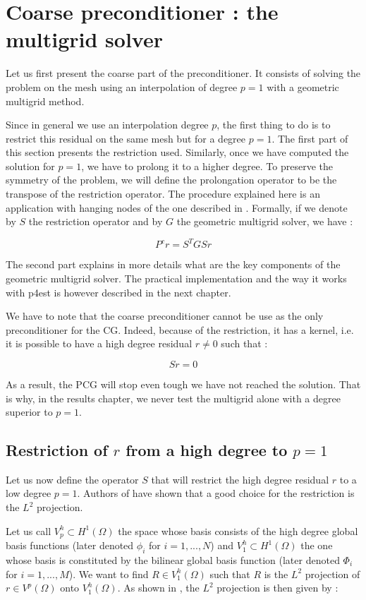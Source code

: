 \section{Coarse preconditioner : the multigrid solver}

Let us first present the coarse part of the preconditioner. It consists of solving the problem on the mesh using an interpolation of degree $p=1$ with a geometric multigrid method. 

Since in general we use an interpolation degree $p$, the first thing to do is to restrict this residual on the same mesh but for a degree $p=1$. The first part of this section presents the restriction used. Similarly, once we have computed the solution for $p=1$, we have to prolong it to a higher degree. To preserve the symmetry of the problem, we will define the prolongation operator to be the transpose of the restriction operator. The procedure explained here is an application with hanging nodes of the one described in \cite{remacle}. Formally, if we denote by $S$ the restriction operator and by $G$ the geometric multigrid solver, we have : 

$$P^cr = S^TGSr$$

The second part explains in more details what are the key components of the geometric multigrid solver. The practical implementation and the way it works with p4est is however described in the next chapter. 

We have to note that the coarse preconditioner cannot be use as the only preconditioner for the CG. Indeed, because of the restriction, it has a kernel, i.e. it is possible to have a high degree residual $r\neq 0$ such that : 

$$Sr = 0$$

As a result, the PCG will stop even tough we have not reached the solution. That is why, in the results chapter, we never test the multigrid alone with a degree superior to $p=1$. 

\subsection{Restriction of $r$ from a high degree to $p=1$}

Let us now define the operator $S$ that will restrict the high degree residual $r$ to a low degree $p=1$. Authors of \cite{l2proj} have shown that a good choice for the restriction is the $L^2$ projection. 

Let us call $V^h_p \subset H^1(\Omega)$ the space whose basis consists of the high degree global basis functions (later denoted $\phi_i$ for $i=1,...,N$) and $V^h_1 \subset H^1(\Omega)$ the one whose basis is constituted by the bilinear global basis function (later denoted $\Phi_i$ for $i=1,...,M$). We want to find $R \in V^h_1(\Omega)$ such that $R$ is the $L^2$ projection of $r \in V^p(\Omega)$ onto $ V^h_1(\Omega)$. As shown in \cite{remacle}, the $L^2$ projection is then given by :

